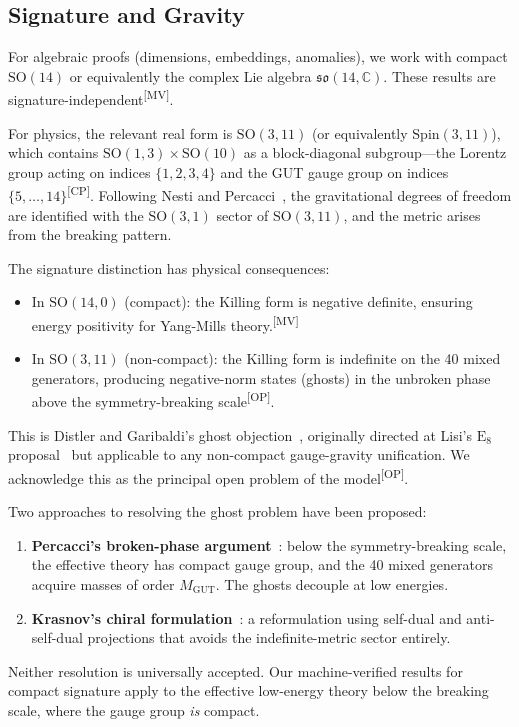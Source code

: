 \documentclass[aps,prd,twocolumn,showpacs,preprintnumbers,superscriptaddress,floatfix]{revtex4-2}
\newcommand{\so}{\mathfrak{so}}
\newcommand{\MV}{\textsuperscript{[MV]}}
\newcommand{\CP}{\textsuperscript{[CP]}}
\newcommand{\OP}{\textsuperscript{[OP]}}
\begin{document}
\subsection{Signature and Gravity}
\label{sec:signature}

For algebraic proofs (dimensions, embeddings, anomalies), we work
with compact $\mathrm{SO}(14)$ or equivalently the complex Lie
algebra $\so(14, \mathbb{C})$.  These results are
signature-independent\MV.

For physics, the relevant real form is $\mathrm{SO}(3,11)$ (or
equivalently $\mathrm{Spin}(3,11)$), which contains
$\mathrm{SO}(1,3) \times \mathrm{SO}(10)$ as a block-diagonal
subgroup---the Lorentz group acting on indices $\{1,2,3,4\}$ and
the GUT gauge group on indices $\{5,\ldots,14\}$\CP.  Following Nesti and
Percacci~\cite{nesti2007,nesti2010}, the gravitational degrees of
freedom are identified with the $\mathrm{SO}(3,1)$ sector of
$\mathrm{SO}(3,11)$, and the metric arises from the breaking
pattern.

The signature distinction has physical consequences:
\begin{itemize}
\item In $\mathrm{SO}(14,0)$ (compact): the Killing form is negative
  definite, ensuring energy positivity for Yang-Mills
  theory.\MV
\item In $\mathrm{SO}(3,11)$ (non-compact): the Killing form is
  indefinite on the 40 mixed generators, producing negative-norm
  states (ghosts) in the unbroken phase above the symmetry-breaking
  scale\OP.
\end{itemize}

This is Distler and Garibaldi's ghost objection~\cite{distler2010},
originally directed at Lisi's $\mathrm{E}_8$ proposal~\cite{lisi2007}
but applicable to any non-compact gauge-gravity unification.  We
acknowledge this as the principal open problem of the
model\OP.

Two approaches to resolving the ghost problem have been
proposed:
\begin{enumerate}
\item \textbf{Percacci's broken-phase argument}~\cite{nesti2010}:
  below the symmetry-breaking scale, the effective theory has compact
  gauge group, and the 40 mixed generators acquire masses of order
  $M_\text{GUT}$.  The ghosts decouple at low energies.
\item \textbf{Krasnov's chiral formulation}~\cite{krasnov2018}: a
  reformulation using self-dual and anti-self-dual projections that
  avoids the indefinite-metric sector entirely.
\end{enumerate}
Neither resolution is universally accepted.  Our machine-verified
results for compact signature apply to the effective low-energy theory
below the breaking scale, where the gauge group \emph{is} compact.
\end{document}

